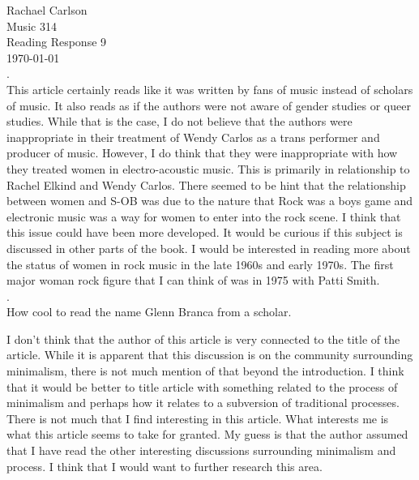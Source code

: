 \documentclass[12pt]{article}
\begin{document}
\noindent Rachael Carlson\\
Music 314\\
Reading Response 9\\
\today\\

\noindent {}.\\

This article certainly reads like it was written by fans of music instead of scholars of music. It also reads as if the authors were not aware of gender studies or queer studies. While that is the case, I do not believe that the authors were inappropriate in their treatment of Wendy Carlos as a trans performer and producer of music. However, I do think that they were inappropriate with how they treated women in electro-acoustic music. This is primarily in relationship to Rachel Elkind and Wendy Carlos. There seemed to be hint that the relationship between women and S-OB was due to the nature that Rock was a boys game and electronic music was a way for women to enter into the rock scene. I think that this issue could have been more developed. It would be curious if this subject is discussed in other parts of the book. I would be interested in reading more about the status of women in rock music in the late 1960s and early 1970s. The first major woman rock figure that I can think of was in 1975 with Patti Smith.\\

\noindent {}.\\

How cool to read the name Glenn Branca from a scholar.

I don't think that the author of this article is very connected to the title of the article. While it is apparent that this discussion is on the community surrounding minimalism, there is not much mention of that beyond the introduction. I think that it would be better to title article with something related to the process of minimalism and perhaps how it relates to a subversion of traditional processes. There is not much that I find interesting in this article. What interests me is what this article seems to take for granted. My guess is that the author assumed that I have read the other interesting discussions surrounding minimalism and process. I think that I would want to further research this area. 
\end{document}
